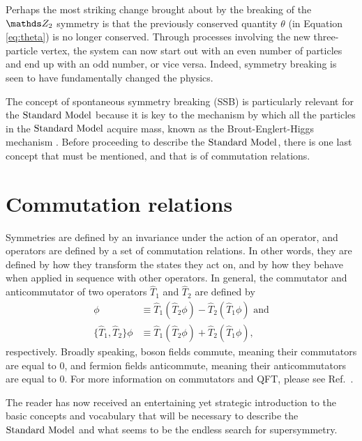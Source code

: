Perhaps the most striking change brought about by the breaking of the $\ztwo$ symmetry is that the previously conserved quantity $\theta$ (in Equation \ref{eq:theta}) is no longer conserved. Through processes involving the new three-particle vertex, the system can now start out with an even number of particles and end up with an odd number, or vice versa. Indeed, symmetry breaking is seen to have fundamentally changed the physics.

The concept of spontaneous symmetry breaking (SSB) is particularly relevant for the $\text{Standard\ Model}$ because it is key to the mechanism by which all the particles in the $\text{Standard\ Model}$ acquire mass, known as the Brout-Englert-Higgs mechanism \cite{Higgs:1964pj}. Before proceeding to describe the $\text{Standard\ Model}$, there is one last concept that must be mentioned, and that is of commutation relations.

\section{Commutation relations}
Symmetries are defined by an invariance under the action of an operator, and operators are defined by a set of commutation relations. In other words, they are defined by how they transform the states they act on, and by how they behave when applied in sequence with other operators. In general, the commutator and anticommutator of two operators $\hat{T}_1$ and $\hat{T}_2$ are defined by
\begin{align}
[\hat{T}_1,\hat{T}_2]\phi &\equiv \hat{T}_1 (\hat{T}_2 \phi)  - \hat{T}_2 (\hat{T}_1 \phi) \text{\ and}\\
\{\hat{T}_1,\hat{T}_2\}\phi &\equiv \hat{T}_1 (\hat{T}_2 \phi)  + \hat{T}_2 (\hat{T}_1 \phi),
\end{align}
respectively. Broadly speaking, boson fields commute, meaning their commutators are equal to 0, and fermion fields anticommute, meaning their anticommutators are equal to 0. For more information on commutators and QFT, please see Ref.~\cite{Peskin:1995ev}.

The reader has now received an entertaining yet strategic introduction to the basic concepts and vocabulary that will be necessary to describe the $\text{Standard\ Model}$ and what seems to be the endless search for supersymmetry.



